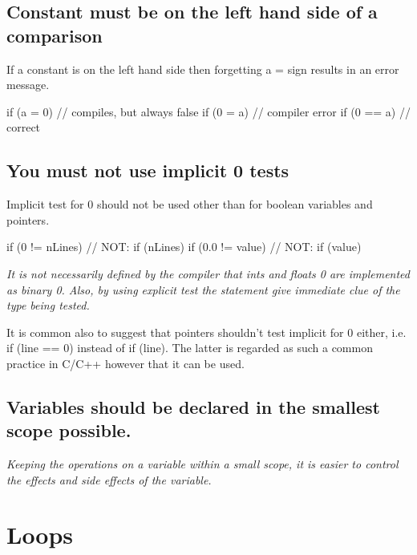 \documentclass[a4paper,11pt,oneside]{scrbook}
\newcommand{\guideline}[1]{{\subsection{#1}}}
\newcommand{\motivation}[1]{{\normalfont \itshape #1}}
\newcommand{\trcode}[1]{{\normalfont \ttfamily #1}}
\begin{document}
\guideline{Constant must be on the left hand side of a comparison}

If a constant is on the left hand side then forgetting a \trcode{=} sign
results in an error message.

\begin{code}
  if (a = 0)        // compiles, but always false
  if (0 = a)        // compiler error
  if (0 == a)       // correct
\end{code}

\guideline{You must not use implicit 0 tests}

Implicit test for 0 should not be used other than for boolean
variables and pointers.

\begin{code}
  if (0 != nLines)        // NOT: if (nLines)
  if (0.0 != value)       // NOT: if (value) 
\end{code}

\motivation{
  It is not necessarily defined by the compiler that ints and floats 0
  are implemented as binary 0. Also, by using explicit test the
  statement give immediate clue of the type being tested.
}

It is common also to suggest that pointers shouldn't test implicit for
0 either, i.e. if (line == 0) instead of if (line). The latter is
regarded as such a common practice in C/C++ however that it can be
used.

\guideline{Variables should be declared in the smallest scope possible. }

\motivation{ 
  Keeping the operations on a variable within a small
  scope, it is easier to control the effects and side effects of the
  variable.
}

\section{Loops}
\end{document}
